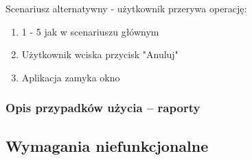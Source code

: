 Scenariusz alternatywny - użytkownik przerywa operację:
\begin{enumerate}
  \item 1 - 5 jak w scenariuszu głównym
  \item Użytkownik wciska przycisk "Anuluj"
  \item Aplikacja zamyka okno
\end{enumerate}

\subsubsection{Opis przypadków użycia -- raporty}

\subsection{Wymagania niefunkcjonalne}

